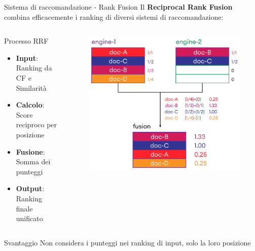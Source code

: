 \documentclass{beamer}
\begin{document}
	\begin{frame}{Sistema di raccomandazione - Rank Fusion}
		Il \textbf{Reciprocal Rank Fusion} combina efficacemente i ranking di diversi sistemi di raccomandazione:

		\begin{columns}
			\begin{column}{0.6\textwidth}
				\begin{block}{Processo RRF}
					\begin{itemize}
						\item \textbf{Input}: Ranking da CF e Similarità
						\item \textbf{Calcolo}: Score reciproco per posizione
						\item \textbf{Fusione}: Somma dei punteggi
						\item \textbf{Output}: Ranking finale unificato
					\end{itemize}
				\end{block}
			\end{column}
			\begin{column}{0.4\textwidth}
				\begin{figure}
					\centering
					\includegraphics[width=\textwidth]{Reciprocal-Rank-Fusion.png}
				\end{figure}
			\end{column}
		\end{columns}

		\begin{alertblock}{Svantaggio}
			Non considera i punteggi nei ranking di input, solo la loro posizione
		\end{alertblock}
	\end{frame}
\end{document}
